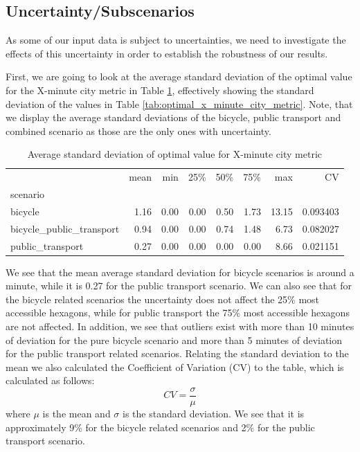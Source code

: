 \subsection{Uncertainty/Subscenarios}
\label{subsec:uncertainty_subscenarios}

As some of our input data is subject to uncertainties, we need to investigate the effects of this uncertainty in order to establish the robustness of our results.

First, we are going to look at the average standard deviation of the optimal value for the X-minute city metric in Table \ref{tab:average_standard_deviation_of_optimal_value_for_x_minute_city_metric}, effectively showing the standard deviation of the values in Table \ref{tab:optimal_x_minute_city_metric}.
Note, that we display the average standard deviations of the bicycle, public transport and combined scenario as those are the only ones with uncertainty.

\begin{table}
  \caption{Average standard deviation of optimal value for X-minute city metric}
  \label{tab:average_standard_deviation_of_optimal_value_for_x_minute_city_metric}
  \begin{center}
    \begin{tabular}{lrrrrrrr}
     & mean & min & 25\% & 50\% & 75\% & max & CV \\
    scenario &  &  &  &  &  &  &  \\
    bicycle & 1.16 & 0.00 & 0.00 & 0.50 & 1.73 & 13.15 & 0.093403 \\
    bicycle_public_transport & 0.94 & 0.00 & 0.00 & 0.74 & 1.48 & 6.73 & 0.082027 \\
    public_transport & 0.27 & 0.00 & 0.00 & 0.00 & 0.00 & 8.66 & 0.021151 \\
    \end{tabular}
  \end{center}
\end{table}


We see that the mean average standard deviation for bicycle scenarios is around a minute, while it is 0.27 for the public transport scenario.
We can also see that for the bicycle related scenarios the uncertainty does not affect the 25\% most accessible hexagons, while for public transport the 75\% most accessible hexagons are not affected.
In addition, we see that outliers exist with more than 10 minutes of deviation for the pure bicycle scenario and more than 5 minutes of deviation for the public transport related scenarios.
Relating the standard deviation to the mean we also calculated the Coefficient of Variation (CV) to the table, which is calculated as follows:
$$ CV = \frac{\sigma}{\mu} $$
where $\mu$ is the mean and $\sigma$ is the standard deviation.
We see that it is approximately 9\% for the bicycle related scenarios and 2\% for the public transport scenario.

